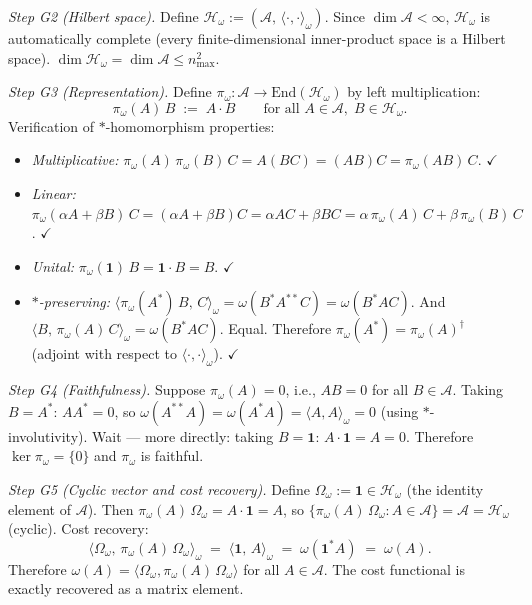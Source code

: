 \documentclass[11pt]{article}
\theoremstyle{remark}
\begin{document}
\begin{tcolorbox}[apfbox, title={Theorem $T_{\mathrm{GNS}}$ (GNS Construction: General Case)}]
\textit{Step G2 (Hilbert space).}  Define $\mathcal{H}_\omega := (\mathcal{A},\, \langle \cdot, \cdot \rangle_\omega)$.  Since $\dim \mathcal{A} < \infty$, $\mathcal{H}_\omega$ is automatically complete (every finite-dimensional inner-product space is a Hilbert space).  $\dim \mathcal{H}_\omega = \dim \mathcal{A} \le n_{\max}^2$.

\textit{Step G3 (Representation).}  Define $\pi_\omega: \mathcal{A} \to \mathrm{End}(\mathcal{H}_\omega)$ by left multiplication:
\[
\pi_\omega(A)\, B \;:=\; A \cdot B \qquad \text{for all } A \in \mathcal{A},\; B \in \mathcal{H}_\omega.
\]
Verification of $*$-homomorphism properties:
\begin{itemize}[nosep,leftmargin=2em,itemsep=2pt]
\item \textit{Multiplicative:} $\pi_\omega(A)\,\pi_\omega(B)\,C = A(BC) = (AB)C = \pi_\omega(AB)\,C$.  $\checkmark$
\item \textit{Linear:} $\pi_\omega(\alpha A + \beta B)\,C = (\alpha A + \beta B)C = \alpha AC + \beta BC = \alpha\,\pi_\omega(A)\,C + \beta\,\pi_\omega(B)\,C$.  $\checkmark$
\item \textit{Unital:} $\pi_\omega(\mathbf{1})\,B = \mathbf{1} \cdot B = B$.  $\checkmark$
\item \textit{$*$-preserving:} $\langle \pi_\omega(A^*)\,B,\, C \rangle_\omega = \omega(B^* A^{**} C) = \omega(B^* A C)$.  And $\langle B,\, \pi_\omega(A)\,C \rangle_\omega = \omega(B^* A C)$.  Equal.  Therefore $\pi_\omega(A^*) = \pi_\omega(A)^\dagger$ (adjoint with respect to $\langle \cdot, \cdot \rangle_\omega$).  $\checkmark$
\end{itemize}

\textit{Step G4 (Faithfulness).}  Suppose $\pi_\omega(A) = 0$, i.e., $AB = 0$ for all $B \in \mathcal{A}$.  Taking $B = A^*$: $AA^* = 0$, so $\omega(A^{**} A) = \omega(A^* A) = \langle A, A \rangle_\omega = 0$ (using $*$-involutivity).  Wait --- more directly: taking $B = \mathbf{1}$: $A \cdot \mathbf{1} = A = 0$.  Therefore $\ker \pi_\omega = \{0\}$ and $\pi_\omega$ is faithful.

\textit{Step G5 (Cyclic vector and cost recovery).}  Define $\Omega_\omega := \mathbf{1} \in \mathcal{H}_\omega$ (the identity element of $\mathcal{A}$).  Then $\pi_\omega(A)\,\Omega_\omega = A \cdot \mathbf{1} = A$, so $\{\pi_\omega(A)\,\Omega_\omega : A \in \mathcal{A}\} = \mathcal{A} = \mathcal{H}_\omega$ (cyclic).  Cost recovery:
\[
\langle \Omega_\omega,\, \pi_\omega(A)\, \Omega_\omega \rangle_\omega \;=\; \langle \mathbf{1},\, A \rangle_\omega \;=\; \omega(\mathbf{1}^* A) \;=\; \omega(A).
\]
Therefore $\omega(A) = \langle \Omega_\omega, \pi_\omega(A)\, \Omega_\omega \rangle$ for all $A \in \mathcal{A}$.  The cost functional is exactly recovered as a matrix element.


\end{tcolorbox}
\end{document}
